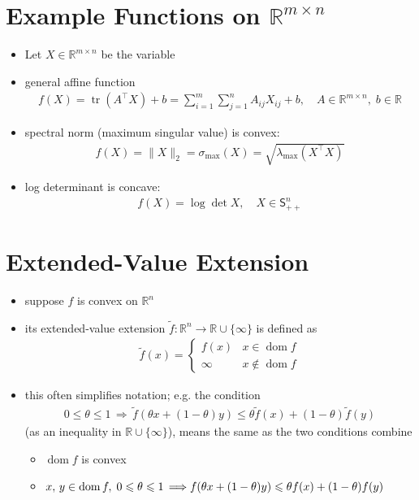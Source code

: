 \documentclass[11pt]{extarticle}
\newcommand{\ds}{\displaystyle}
\newcommand{\ie}{\,\Longrightarrow\,}
\DeclareMathOperator*{\dom}{dom}
\DeclareMathOperator*{\tr}{tr}
\theoremstyle{definition}
\begin{document}
\newpage

\section*{Example Functions on $\mathbb{R}^{m\times n}$}

\begin{itemize}
  \item Let $\ds X\in\mathbb{R}^{m\times n}$ be the variable
  \item general affine function
    \begin{align*}
      f(X) = \tr(A^\top X) + b = \sum_{i=1}^m\sum_{j=1}^n A_{ij} X_{ij} + b, \quad A\in\mathbb{R}^{m\times n},\;b\in\mathbb{R}
    \end{align*}
  \item spectral norm (maximum singular value) is convex: 
    \begin{align*}
      f(X) = \|X\|_2 = \sigma_{\text{max}}(X) = \sqrt{\lambda_{\text{max}}(X^\top X)}
    \end{align*}
  \item log determinant is concave:
    \begin{align*}
      f(X) = \log\det X, \quad X\in\mathsf{S}^n_{++}
    \end{align*}
\end{itemize}

\newpage

\section*{Extended-Value Extension}
\begin{itemize}
  \item suppose $f$ is convex on $\mathbb{R}^n$
  \item its extended-value extension $\ds\widetilde{f}: \mathbb{R}^n\to\mathbb{R}\cup\{\infty\}$ is defined as
    \begin{align*}
      \widetilde{f}(x) = \begin{cases}f(x) & x\in\dom f \\ \infty & x\not\in\dom f\end{cases} 
    \end{align*}
  \item this often simplifies notation; e.g. the condition 
    \begin{align*}
      0\leqslant\theta\leqslant 1\ie\widetilde{f}(\theta x + (1 - \theta) y)\leqslant\theta\widetilde{f}(x) + (1 - \theta)\widetilde{f}(y)
    \end{align*}
    (as an inequality in $\mathbb{R}\cup\{\infty\}$), means the same as the two conditions combine
    \begin{itemize}
      \item $\dom f$ is convex
      \item $x,\,y\in\dom f,\;0\leqslant\theta\leqslant 1 \ie \\ f(\theta x + (1 - \theta)y)\leqslant\theta f(x) + (1 - \theta) f(y)$
    \end{itemize}
\end{itemize}
\end{document}
